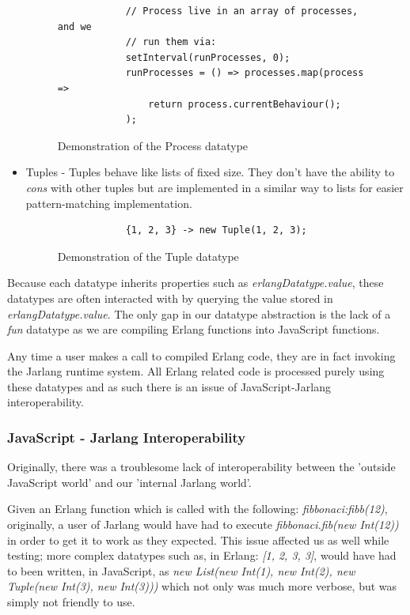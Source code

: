 \documentclass[twoside,12pt,titlepage,a4paper]{article}
\begin{document}
\begin{itemize}
\begin{figure}[H]
\begin{verbatim}
	        // Process live in an array of processes, and we
	        // run them via:
	        setInterval(runProcesses, 0);
	        runProcesses = () => processes.map(process =>
	            return process.currentBehaviour();
	        );

	\end{verbatim}
	\caption{Demonstration of the Process datatype}
	\end{figure}

	\item Tuples - Tuples behave like lists of fixed size. They don't have the ability to \textit{cons} with other tuples but are implemented in a similar way to lists for easier pattern-matching implementation.
	\begin{figure}[H]
	\begin{verbatim}
	        {1, 2, 3} -> new Tuple(1, 2, 3);
	\end{verbatim}
	\caption{Demonstration of the Tuple datatype}
	\end{figure}

\end{itemize}

Because each datatype inherits properties such as \textit{erlangDatatype.value}, these datatypes are often interacted with by querying the value stored in \textit{erlangDatatype.value}. The only gap in our datatype abstraction is the lack of a \textit{fun} datatype as we are compiling Erlang functions into JavaScript functions.

Any time a user makes a call to compiled Erlang code, they are in fact invoking the Jarlang runtime system. All Erlang related code is processed purely using these datatypes and as such there is an issue of JavaScript-Jarlang interoperability.

\subsubsection{JavaScript - Jarlang Interoperability}
Originally, there was a troublesome lack of interoperability between the 'outside JavaScript world' and our 'internal Jarlang world'.

Given an Erlang function which is called with the following: \textit{fibbonaci:fibb(12)}, originally, a user of Jarlang would have had to execute \textit{fibbonaci.fib(new Int(12))} in order to get it to work as they expected. This issue affected us as well while testing; more complex datatypes such as, in Erlang: \textit{[1, 2, {3, 3}]}, would have had to been written, in JavaScript, as \textit{new List(new Int(1), new Int(2), new Tuple(new Int(3), new Int(3)))} which not only was much more verbose, but was simply not friendly to use.
\end{document}
